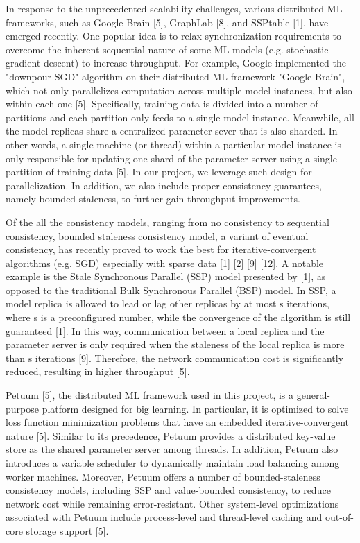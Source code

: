 \documentclass{article} %
\begin{document}
In response to the unprecedented scalability challenges, various distributed ML frameworks, such as Google Brain [5], GraphLab [8], and SSPtable [1], have emerged recently. One popular idea is to relax synchronization requirements to overcome the inherent sequential nature of some ML models (e.g. stochastic gradient descent) to increase throughput. For example, Google implemented the "downpour SGD" algorithm on their distributed ML framework "Google Brain", which not only parallelizes computation across multiple model instances, but also within each one [5]. Specifically, training data is divided into a number of partitions and each partition only feeds to a single model instance. Meanwhile, all the model replicas share a centralized parameter sever that is also sharded. In other words, a single machine (or thread) within a particular model instance is only responsible for updating one shard of the parameter server using a single partition of training data [5]. In our project, we leverage such design for parallelization. In addition, we also include proper consistency guarantees, namely bounded staleness, to further gain throughput improvements.

Of the all the consistency models, ranging from no consistency to sequential consistency, bounded staleness consistency model, a variant of eventual consistency, has recently proved to work the best for iterative-convergent algorithms (e.g. SGD) especially with sparse data [1] [2] [9] [12]. A notable example is the Stale Synchronous Parallel (SSP) model presented by [1], as opposed to the traditional Bulk Synchronous Parallel (BSP) model. In SSP, a model replica is allowed to lead or lag other replicas by at most s iterations, where s is a preconfigured number, while the convergence of the algorithm is still guaranteed [1]. In this way, communication between a local replica and the parameter server is only required when the staleness of the local replica is more than s iterations [9]. Therefore, the network communication cost is significantly reduced, resulting in higher throughput [5].

Petuum [5], the distributed ML framework used in this project, is a general-purpose platform designed for big learning. In particular, it is optimized to solve loss function minimization problems that have an embedded iterative-convergent nature [5]. Similar to its precedence, Petuum provides a distributed key-value store as the shared parameter server among threads. In addition, Petuum also introduces a variable scheduler to dynamically maintain load balancing among worker machines. Moreover, Petuum offers a number of bounded-staleness consistency models, including SSP and value-bounded consistency, to reduce network cost while remaining error-resistant. Other system-level optimizations associated with Petuum include process-level and thread-level caching and out-of-core storage support [5].
\end{document}
